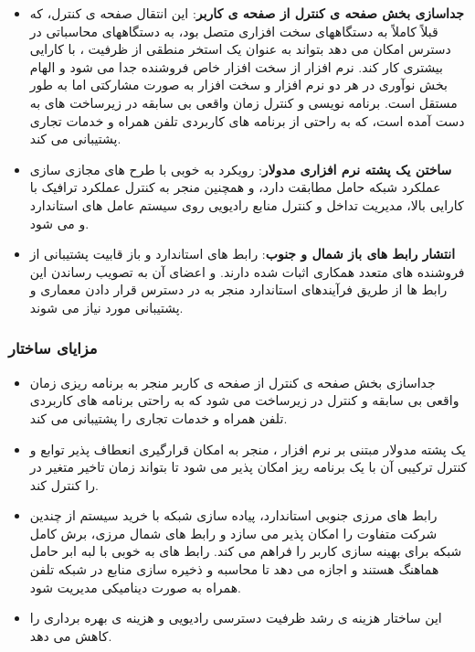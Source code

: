 \begin{itemize}
\item \textbf{ جداسازی بخش صفحه ی کنترل از 
صفحه ی کاربر}:
این انتقال صفحه ی کنترل، که قبلاً کاملاً به دستگاههای سخت افزاری  متصل بود، به دستگاههای محاسباتی در دسترس امکان می دهد  بتواند به عنوان یک استخر منطقی از ظرفیت ، با کارایی بیشتری کار کند.
نرم افزار  از سخت افزار خاص فروشنده جدا می شود و الهام بخش نوآوری در هر دو نرم افزار و سخت افزار به صورت مشارکتی اما به طور مستقل است.
برنامه نویسی و کنترل زمان واقعی بی سابقه در زیرساخت های  به دست آمده است، که به راحتی از برنامه های کاربردی تلفن همراه و خدمات تجاری پشتیبانی می کند.
\item \textbf{ساختن یک پشته نرم افزاری  مدولار}:
رویکرد  به خوبی با طرح های مجازی سازی عملکرد شبکه حامل  مطابقت دارد، و همچنین منجر به کنترل عملکرد ترافیک با کارایی بالا، مدیریت تداخل و کنترل منابع رادیویی روی سیستم عامل های استاندارد  و می شود.
\item \textbf{انتشار رابط های باز شمال و جنوب}: 
رابط های استاندارد و باز قابیت پشتیبانی از فروشنده های متعدد همکاری اثبات شده دارند. 
و اعضای آن به تصویب رساندن این رابط ها از طریق فرآیندهای استاندارد منجر به در دسترس قرار دادن معماری  و پشتیبانی مورد نیاز می شوند.

\end{itemize}
\subsubsection{مزایای ساختار }
\begin{itemize}
\item 
جداسازی بخش صفحه ی کنترل از 
صفحه ی کاربر 
منجر به 
برنامه ریزی زمان واقعی بی سابقه و کنترل در زیرساخت  می شود که به راحتی برنامه های کاربردی تلفن همراه و خدمات تجاری را پشتیبانی می کند.
\item 
یک پشته  مدولار مبتنی بر نرم افزار ، منجر به امکان قرارگیری انعطاف پذیر توابع  و کنترل ترکیبی آن با یک برنامه ریز امکان پذیر می شود تا بتواند زمان تاخیر متغیر در  را کنترل کند.
\item 
رابط های مرزی جنوبی استاندارد، پیاده سازی شبکه با خرید سیستم از چندین شرکت متفاوت را امکان پذیر می سازد و رابط های شمال مرزی، برش کامل شبکه برای بهینه سازی   کاربر را فراهم می کند.
رابط های  به خوبی با لبه ابر حامل هماهنگ هستند و اجازه می دهد تا  محاسبه و ذخیره سازی منابع در شبکه تلفن همراه 
به صورت دینامیکی مدیریت شود.
\item 
این ساختار هزینه ی رشد ظرفیت دسترسی رادیویی و هزینه ی بهره برداری را کاهش می دهد.
\end{itemize}
